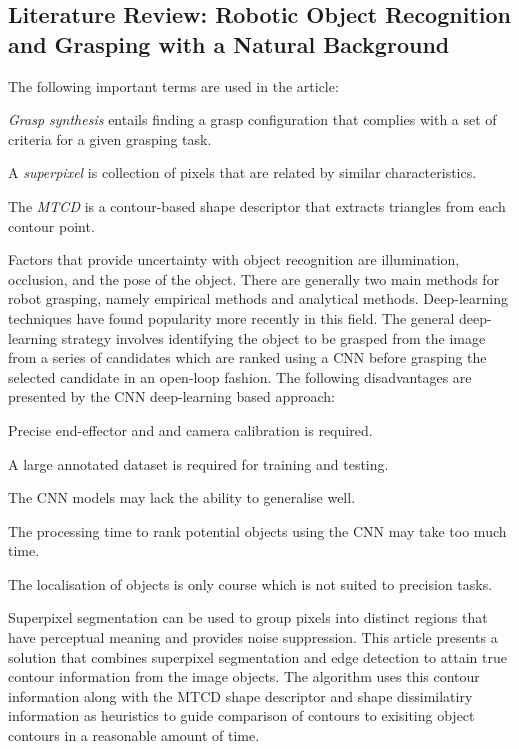 \subsection{Literature Review: Robotic Object Recognition and Grasping with a Natural Background \cite{Wei2020}}

The following important terms are used in the article:

\begin{compactitem}
    \item \textit{Grasp synthesis} entails finding a grasp configuration that complies with a set of criteria for a given grasping task.
    \item A \textit{superpixel} is collection of pixels that are related by similar characteristics.
    \item The \textit{\ac{MTCD}} is a contour-based shape descriptor that extracts triangles from each contour point. \cite{Yang2016}
\end{compactitem}

Factors that provide uncertainty with object recognition are illumination, occlusion, and the pose of the object. There are generally two main methods for robot grasping, namely empirical methods and analytical methods. Deep-learning techniques have found popularity more recently in this field. The general deep-learning strategy involves identifying the object to be grasped from the image from a series of candidates which are ranked using a \ac{CNN} before grasping the selected candidate in an open-loop fashion. The following disadvantages are presented by the \ac{CNN} deep-learning based approach:

\begin{compactitem}
    \item Precise end-effector and and camera calibration is required.
    \item A large annotated dataset is required for training and testing.
    \item The \ac{CNN} models may lack the ability to generalise well.
    \item The processing time to rank potential objects using the \ac{CNN} may take too much time.
    \item The localisation of objects is only course which is not suited to precision tasks.
\end{compactitem}

Superpixel segmentation can be used to group pixels into distinct regions that have perceptual meaning and provides noise suppression. This article presents a solution that combines superpixel segmentation and edge detection to attain true contour information from the image objects. The algorithm uses this contour information along with the \ac{MTCD} shape descriptor and shape dissimilatiry information as heuristics to guide comparison of contours to exisiting object contours in a reasonable amount of time.

\pendsign